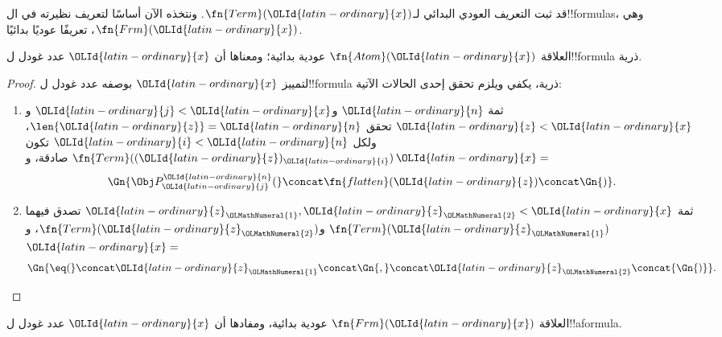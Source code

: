\documentclass[../../../include/open-logic-section]{subfiles}
\begin{document}

قد ثبت التعريف العودي البدائي لـ$\fn{Term}(\OLId{latin-ordinary}{x})$.
ونتخذه الآن أساسًا لتعريف نظيرته في
ال!!{formula}s، وهي $\fn{Frm}(\OLId{latin-ordinary}{x})$،
تعريفًا عوديًا بدائيًا.

\begin{prop}
العلاقة $\fn{Atom}(\OLId{latin-ordinary}{x})$ عودية بدائية؛ ومعناها أن $\OLId{latin-ordinary}{x}$
عدد غودل ل!!{formula} ذرية.
\end{prop}

\begin{proof}
لتمييز $\OLId{latin-ordinary}{x}$ بوصفه عدد غودل ل!!{formula} ذرية،
يكفي ويلزم تحقق إحدى الحالات الآتية:
\begin{enumerate}
\item ثمة $\OLId{latin-ordinary}{n}$ و$\OLId{latin-ordinary}{j}<\OLId{latin-ordinary}{x}$ و$\OLId{latin-ordinary}{z}<\OLId{latin-ordinary}{x}$ تحقق $\len{\OLId{latin-ordinary}{z}}=\OLId{latin-ordinary}{n}$، ولكل $\OLId{latin-ordinary}{i}<\OLId{latin-ordinary}{n}$ تكون
  $\fn{Term}((\OLId{latin-ordinary}{z})_\OLId{latin-ordinary}{i})$ صادقة، و$\OLId{latin-ordinary}{x}=$
\[
\Gn{\Obj P^\OLId{latin-ordinary}{n}_\OLId{latin-ordinary}{j}(} \concat \fn{flatten}(\OLId{latin-ordinary}{z}) \concat \Gn{)}.
\]
\item ثمة $\OLId{latin-ordinary}{z}_\OLMathNumeral{1},\OLId{latin-ordinary}{z}_\OLMathNumeral{2}<\OLId{latin-ordinary}{x}$ تصدق فيهما $\fn{Term}(\OLId{latin-ordinary}{z}_\OLMathNumeral{1})$ و$\fn{Term}(\OLId{latin-ordinary}{z}_\OLMathNumeral{2})$،
  و$\OLId{latin-ordinary}{x}=$
\[
\Gn{{\eq}(} \concat \OLId{latin-ordinary}{z}_\OLMathNumeral{1} \concat \Gn{,} \concat \OLId{latin-ordinary}{z}_\OLMathNumeral{2} \concat{\Gn{)}}.
\]
\end{enumerate}
\end{proof}

\begin{prop}
العلاقة $\fn{Frm}(\OLId{latin-ordinary}{x})$ عودية بدائية، ومفادها أن $\OLId{latin-ordinary}{x}$
عدد غودل ل!!a{formula}.
\end{prop}
\end{document}
